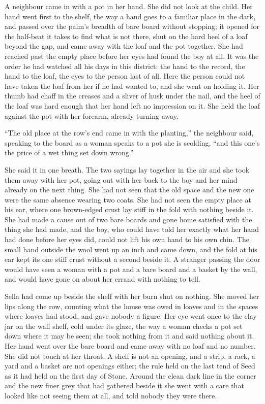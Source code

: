 A neighbour came in with a pot in her hand. She did not look at the child. Her hand went first to the shelf, the way a hand goes to a familiar place in the dark, and passed over the palm's breadth of bare board without stopping; it opened for the half-beat it takes to find what is not there, shut on the hard heel of a loaf beyond the gap, and came away with the loaf and the pot together. She had reached past the empty place before her eyes had found the boy at all. It was the order he had watched all his days in this district: the hand to the record, the hand to the loaf, the eyes to the person last of all. Here the person could not have taken the loaf from her if he had wanted to, and she went on holding it. Her thumb had chaff in the creases and a sliver of husk under the nail, and the heel of the loaf was hard enough that her hand left no impression on it. She held the loaf against the pot with her forearm, already turning away.

“The old place at the row's end came in with the planting,” the neighbour said, speaking to the board as a woman speaks to a pot she is scolding, “and this one's the price of a wet thing set down wrong.”

She said it in one breath. The two sayings lay together in the air and she took them away with her pot, going out with her back to the boy and her mind already on the next thing. She had not seen that the old space and the new one were the same absence wearing two coats. She had not seen the empty place at his ear, where one brown-edged crust lay stiff in the fold with nothing beside it. She had made a cause out of two bare boards and gone home satisfied with the thing she had made, and the boy, who could have told her exactly what her hand had done before her eyes did, could not lift his own hand to his own chin. The small hand outside the wool went up an inch and came down, and the fold at his ear kept its one stiff crust without a second beside it. A stranger passing the door would have seen a woman with a pot and a bare board and a basket by the wall, and would have gone on about her errand with nothing to tell.

Sella had come up beside the shelf with her burn shut on nothing. She moved her lips along the row, counting what the house was owed in loaves and in the spaces where loaves had stood, and gave nobody a figure. Her eye went once to the clay jar on the wall shelf, cold under its glaze, the way a woman checks a pot set down where it may be seen; she took nothing from it and said nothing about it. Her hand went over the bare board and came away with no loaf and no number. She did not touch  at her throat. A shelf is not an opening, and a strip, a rack, a yard and a basket are not openings either; the rule held on the last tend of Seed as it had held on the first day of Stone. Around the clean dark line in the corner and the new finer grey that had gathered beside it she went with a care that looked like not seeing them at all, and told nobody they were there.

